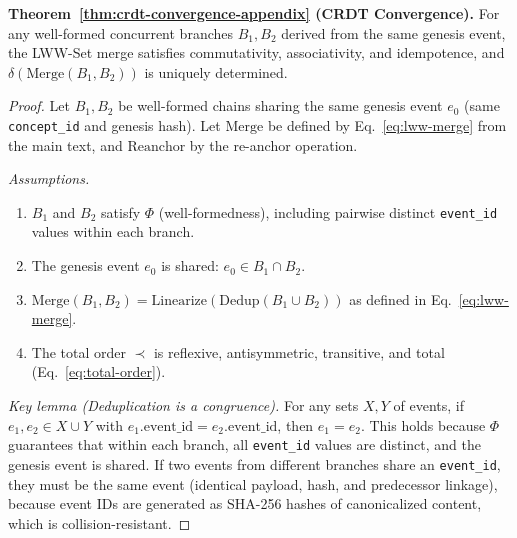 \textbf{Theorem~\ref{thm:crdt-convergence-appendix} (CRDT Convergence).} For any well-formed concurrent branches $B_1, B_2$ derived from the same genesis event, the LWW-Set merge satisfies commutativity, associativity, and idempotence, and $\delta(\text{Merge}(B_1, B_2))$ is uniquely determined.
\begin{proof}
Let $B_1, B_2$ be well-formed chains sharing the same genesis event $e_0$ (same \texttt{concept\_id} and genesis hash). Let $\text{Merge}$ be defined by Eq.~\ref{eq:lww-merge} from the main text, and $\text{Reanchor}$ by the re-anchor operation.

\emph{Assumptions.}
\begin{enumerate}[label=(A\arabic*),leftmargin=2em]
    \item $B_1$ and $B_2$ satisfy $\Phi$ (well-formedness), including pairwise distinct \texttt{event\_id} values within each branch.
    \item The genesis event $e_0$ is shared: $e_0 \in B_1 \cap B_2$.
    \item $\text{Merge}(B_1, B_2) = \text{Linearize}(\text{Dedup}(B_1 \cup B_2))$ as defined in Eq.~\ref{eq:lww-merge}.
    \item The total order $\prec$ is reflexive, antisymmetric, transitive, and total (Eq.~\ref{eq:total-order}).
\end{enumerate}

\emph{Key lemma (Deduplication is a congruence).} For any sets $X, Y$ of events, if $e_1, e_2 \in X \cup Y$ with $e_1.\text{event\_id} = e_2.\text{event\_id}$, then $e_1 = e_2$. This holds because $\Phi$ guarantees that within each branch, all \texttt{event\_id} values are distinct, and the genesis event is shared. If two events from different branches share an \texttt{event\_id}, they must be the same event (identical payload, hash, and predecessor linkage), because event IDs are generated as SHA-256 hashes of canonicalized content, which is collision-resistant.


\end{proof}
